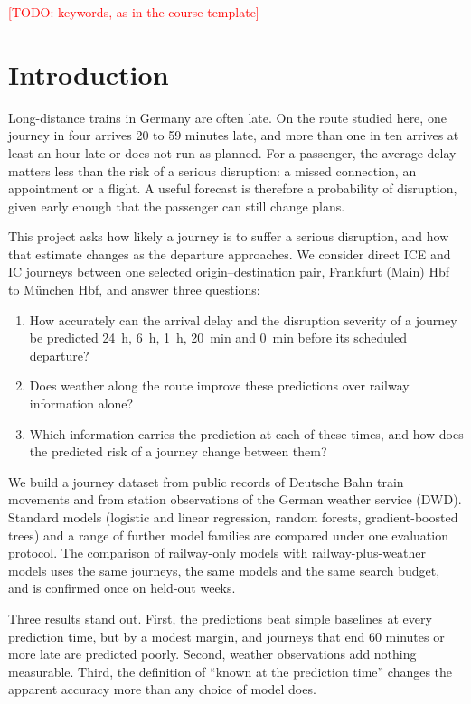 \documentclass[conference]{IEEEtran}
\newcommand{\todo}[1]{\textcolor{red}{[TODO: #1]}}
\begin{document}
\begin{IEEEkeywords}
\todo{keywords, as in the course template}
\end{IEEEkeywords}

\section{Introduction}

Long-distance trains in Germany are often late. On the route studied here, one journey in four
arrives 20 to 59 minutes late, and more than one in ten arrives at least an hour late or does not
run as planned. For a passenger, the average delay matters less than the risk of a serious disruption: a
missed connection, an appointment or a flight. A useful forecast is therefore a probability of
disruption, given early enough that the passenger can still change plans.

This project asks how likely a journey is to suffer a serious disruption, and how that estimate
changes as the departure approaches. We consider direct ICE and IC journeys between one selected
origin--destination pair, Frankfurt (Main) Hbf to M\"unchen Hbf, and answer three questions:

\begin{enumerate}
\item How accurately can the arrival delay and the disruption severity of a journey be predicted
24~h, 6~h, 1~h, 20~min and 0~min before its scheduled departure?
\item Does weather along the route improve these predictions over railway information alone?
\item Which information carries the prediction at each of these times, and how does the predicted
risk of a journey change between them?
\end{enumerate}

We build a journey dataset from public records of Deutsche Bahn train movements and from station
observations of the German weather service (DWD). Standard models (logistic and linear regression,
random forests, gradient-boosted trees) and a range of further model families are compared under one
evaluation protocol. The comparison of railway-only models with railway-plus-weather models uses the
same journeys, the same models and the same search budget, and is confirmed once on held-out weeks.

Three results stand out. First, the predictions beat simple baselines at every prediction time, but
by a modest margin, and journeys that end 60 minutes or more late are predicted poorly. Second,
weather observations add nothing measurable. Third, the definition of ``known at the prediction
time'' changes the apparent accuracy more than any choice of model does.
\end{document}
